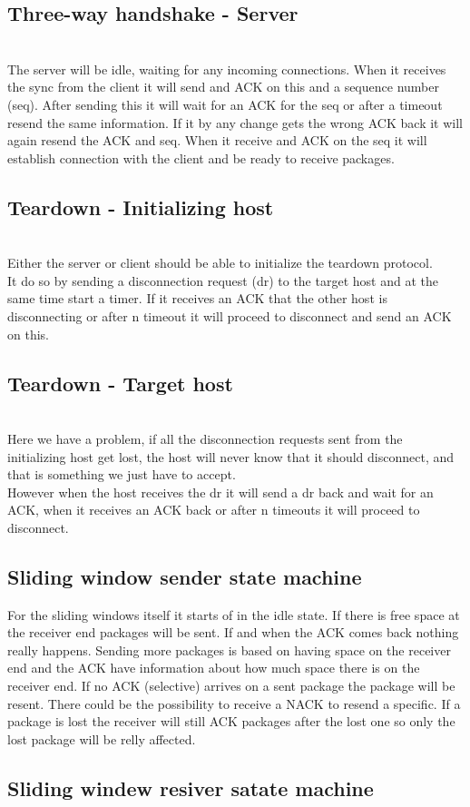 \documentclass[conference]{IEEEtran}
\begin{document}
\subsection{Three-way handshake - Server}

\\
The server will be idle, waiting for any incoming connections. When it receives the sync from the client it will send and ACK on this and a sequence number (seq). After sending this it will wait for an ACK for the seq or after a timeout resend the same information. If it by any change gets the wrong ACK back it will again resend the ACK and seq. When it receive and ACK on the seq it will establish connection with the client and be ready to receive packages.
\subsection{Teardown - Initializing host}

\\
Either the server or client should be able to initialize the teardown protocol.
\\
It do so by sending a disconnection request (dr) to the target host and at the same time start a timer. If it receives an ACK that the other host is disconnecting or after n timeout it will proceed to disconnect and send an ACK on this. 
\subsection{Teardown - Target host}

\\
Here we have a problem, if all the disconnection requests sent from the initializing host get lost, the host will never know that it should disconnect, and that is something we just have to accept.
\\
However when the host receives the dr it will send a dr back and wait for an ACK, when it receives an ACK back or after n timeouts it will proceed to disconnect. 
\subsection{Sliding window sender state machine}

For the sliding windows itself it starts of in the idle state. If there is free space at the receiver end packages will be sent. If and when the ACK comes back nothing really happens. Sending more packages is based on having space on the receiver end and the ACK have information about how much space there is on the receiver end. If no ACK (selective) arrives on a sent package the package will be resent. There could be the possibility to receive a NACK to resend a specific. If a package is lost the receiver will still ACK packages after the lost one so only the lost package will be relly affected. 
\subsection{Sliding windew resiver satate machine}

\end{document}
